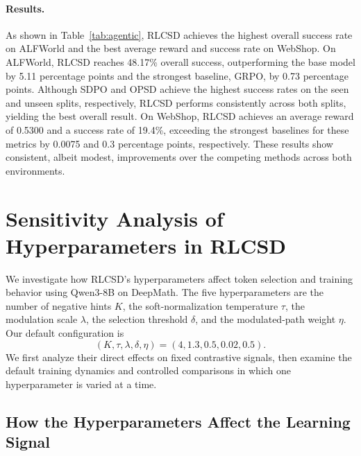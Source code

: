 \paragraph{Results.} As shown in Table~\ref{tab:agentic}, RLCSD achieves the highest overall success rate on ALFWorld and the best average reward and success rate on WebShop. On ALFWorld, RLCSD reaches 48.17\% overall success, outperforming the base model by 5.11 percentage points and the strongest baseline, GRPO, by 0.73 percentage points. Although SDPO and OPSD achieve the highest success rates on the seen and unseen splits, respectively, RLCSD performs consistently across both splits, yielding the best overall result. On WebShop, RLCSD achieves an average reward of 0.5300 and a success rate of 19.4\%, exceeding the strongest baselines for these metrics by 0.0075 and 0.3 percentage points, respectively. These results show consistent, albeit modest, improvements over the competing methods across both environments.


\section{Sensitivity Analysis of Hyperparameters in RLCSD}
\label{app:hyperparameter}

We investigate how RLCSD's hyperparameters affect token selection and training behavior using Qwen3-8B on DeepMath. The five hyperparameters are the number of negative hints $K$, the soft-normalization temperature $\tau$, the modulation scale $\lambda$, the selection threshold $\delta$, and the modulated-path weight $\eta$. Our default configuration is
\begin{equation}
(K,\tau,\lambda,\delta,\eta)=(4,1.3,0.5,0.02,0.5).
\end{equation}
We first analyze their direct effects on fixed contrastive signals, then examine the default training dynamics and controlled comparisons in which one hyperparameter is varied at a time.

\subsection{How the Hyperparameters Affect the Learning Signal}

